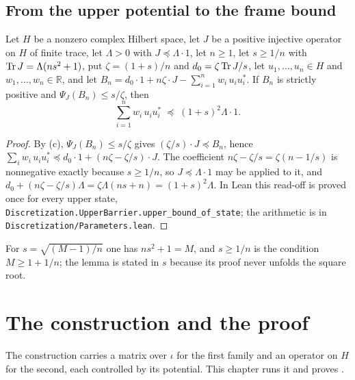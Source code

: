 \section{From the upper potential to the frame bound}

\begin{lemma}
\label{lem:upper-frame-bound}
\leanok
{}
Let $H$ be a nonzero complex Hilbert space, let $J$ be a positive injective operator on $H$
of finite trace, let $\Lambda > 0$ with $J \preceq \Lambda \cdot 1$, let $n \geq 1$, let
$s \geq 1/n$ with $\operatorname{Tr} J = \Lambda (n s^2 + 1)$, put $\zeta = (1 + s)/n$ and
$d_0 = \zeta \operatorname{Tr} J / s$, let $u_1, \dots, u_n \in H$ and $w_1, \dots, w_n \in \mathbb{R}$,
and let $B_n = d_0 \cdot 1 + n \zeta \cdot J - \sum_{i=1}^n w_i \, u_i u_i^*$. If $B_n$ is
strictly positive and $\Psi_J(B_n) \leq s / \zeta$, then
\[
  \sum_{i=1}^n w_i \, u_i u_i^* \; \preceq \; (1 + s)^2 \Lambda \cdot 1 .
\]
\end{lemma}

\begin{proof}
\leanok
{}
By (c), $\Psi_J(B_n) \leq s/\zeta$ gives
$(\zeta / s) \cdot J \preceq B_n$, hence
$\sum_i w_i \, u_i u_i^* \preceq d_0 \cdot 1 + (n\zeta - \zeta/s) \cdot J$. The
coefficient $n\zeta - \zeta/s = \zeta (n - 1/s)$ is nonnegative exactly because
$s \geq 1/n$, so $J \preceq \Lambda \cdot 1$ may be applied to it, and
$d_0 + (n\zeta - \zeta/s)\Lambda = \zeta \Lambda (n s + n) = (1 + s)^2 \Lambda$. In Lean
this read-off is proved once for every upper state,
\texttt{Discretization.UpperBarrier.upper\_bound\_of\_state}; the arithmetic is in
\texttt{Discretization/Parameters.lean}.
\end{proof}

For $s = \sqrt{(M-1)/n}$ one has $n s^2 + 1 = M$, and $s \geq 1/n$ is the condition
$M \geq 1 + 1/n$; the lemma is stated in $s$ because its proof never unfolds the square
root.

\chapter{The construction and the proof}
\label{ch:construction}

The construction carries a matrix over $\iota$ for the first family and an operator on $H$
for the second, each controlled by its potential. This chapter runs it and proves
.

